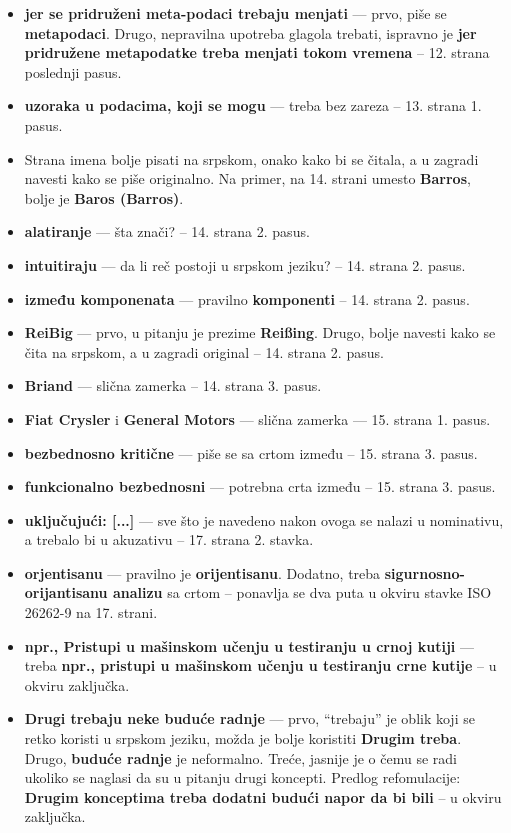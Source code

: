 \documentclass[a4paper]{report}
\begin{document}
\begin{itemize}
\item {\bf{jer se pridruženi meta-podaci trebaju menjati}} --- prvo, piše se {\bf{metapodaci}}. Drugo, nepravilna upotreba glagola trebati, ispravno je {\bf{jer pridružene metapodatke treba menjati tokom vremena}} -- 12. strana poslednji pasus.
\item {\bf{uzoraka u podacima, koji se mogu}} --- treba bez zareza -- 13. strana 1. pasus.
\item Strana imena bolje pisati na srpskom, onako kako bi se čitala, a u zagradi navesti kako se piše originalno. Na primer, na 14. strani umesto {\bf{Barros}}, bolje je {\bf{Baros (Barros)}}.
\item {\bf{alatiranje}} --- šta znači? -- 14. strana 2. pasus.
\item {\bf{intuitiraju}} --- da li reč postoji u srpskom jeziku? -- 14. strana 2. pasus.
\item {\bf{između komponenata}} --- pravilno {\bf{komponenti}} -- 14. strana 2. pasus.
\item {\bf{ReiBig}} --- prvo, u pitanju je prezime {\bf{Rei{\ss}ing}}. Drugo, bolje navesti kako se čita na srpskom, a u zagradi original -- 14. strana 2. pasus.
\item {\bf{Briand}} --- slična zamerka -- 14. strana 3. pasus.
\item {\bf{Fiat Crysler}} i {\bf{General Motors}} --- slična zamerka --- 15. strana 1. pasus.
\item {\bf{bezbednosno kritične}} --- piše se sa crtom između -- 15. strana 3. pasus.
\item {\bf{funkcionalno bezbednosni}} --- potrebna crta između -- 15. strana 3. pasus.
\item {\bf{uključujući: [...]}} --- sve što je navedeno nakon ovoga se nalazi u nominativu, a trebalo bi u akuzativu -- 17. strana 2. stavka.
\item {\bf{orjentisanu}} --- pravilno je {\bf{orijentisanu}}. Dodatno, treba {\bf{sigurnosno-orijantisanu analizu}} sa crtom -- ponavlja se dva puta u okviru stavke ISO 26262-9 na 17. strani.
\item {\bf{npr., Pristupi u mašinskom učenju u testiranju u crnoj kutiji}} --- treba {\bf{npr., pristupi u mašinskom učenju u testiranju crne kutije}} -- u okviru zaključka.
\item {\bf{Drugi trebaju neke buduće radnje}} --- prvo, ``trebaju'' je oblik koji se retko koristi u srpskom jeziku, možda je bolje koristiti {\bf{Drugim treba}}. Drugo, {\bf{buduće radnje}} je neformalno. Treće, jasnije je o čemu se radi ukoliko se naglasi da su u pitanju drugi koncepti. Predlog refomulacije: {\bf{Drugim konceptima treba dodatni budući napor da bi bili}} -- u okviru zaključka.
\end{itemize}
\end{document}
